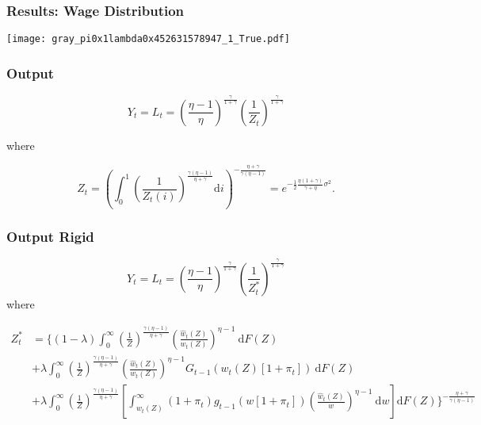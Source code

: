 \documentclass{beamer}
\begin{document}
\begin{frame}[t]\frametitle{Results: Wage Distribution}

    \begin{center}
      \texttt{[image: gray\_pi0x1lambda0x452631578947\_1\_True.pdf]}
      \label{fig:dist_1_periods}
    \end{center}


\end{frame}


\begin{frame}[t]\frametitle{Output}

    \begin{equation*}
        \label{eq:output_flexible}
        Y_t = L_t = \left( \frac{\eta - 1}{\eta} \right)^{\frac{\gamma}{1 + \gamma}} \left( \frac{1}{Z_t} \right)^{\frac{\gamma}{1 + \gamma}}
    \end{equation*}

    where

    \begin{equation*}
        Z_t = \left( \int_{0}^{1}\! \left( \frac{1}{Z_t(i)} \right)^{\frac{\gamma(\eta - 1)}{\eta + \gamma}} \mathrm{d}i \right)^{-\frac{\eta + \gamma}{\gamma(\eta - 1)}} \!\!\! = e^{-\frac{1}{2} \frac{\eta(1 + \gamma)}{\gamma + \eta}\sigma^2 }.
    \end{equation*}


\end{frame}

\begin{frame}[t]\frametitle{Output Rigid}

    \begin{equation*}
        \label{eq:output_rigid}
        Y_t = L_t = \left(\frac{\eta - 1}{\eta} \right)^{\frac{\gamma}{1 + \gamma}}\left( \frac{1}{Z_t^*} \right)^{\frac{\gamma}{1 + \gamma}}
    \end{equation*}
    where

    \begin{equation*}
        \label{eq:z_star}
        \begin{split}
        Z_t^* &= \Big\{(1 - \lambda) \int_{0}^{\infty} \! \left( \frac{1}{Z} \right)^{\frac{\gamma(\eta - 1)}{\eta + \gamma}} \left( \frac{\hat{w}_t(Z)}{w_t(Z)} \right)^{\eta - 1}\ \mathrm{d}F(Z) \\
              &+            \lambda  \int_{0}^{\infty} \! \left( \frac{1}{Z} \right)^{\frac{\gamma(\eta - 1)}{\eta + \gamma}} \left( \frac{\hat{w}_t(Z)}{w_t(Z)} \right)^{\eta - 1} G_{t-1}\left( w_t(Z)[1 + \pi_t] \right)                                                     \ \mathrm{d}F(Z)\\
              &+            \lambda  \int_{0}^{\infty} \! \left( \frac{1}{Z} \right)^{\frac{\gamma(\eta - 1)}{\eta + \gamma}} \left[ \int_{w_t(Z)}^{\infty} (1 + \pi_t)g_{t-1}\left( w[1 + \pi_t] \right) \left( \frac{\hat{w}_t(Z)}{w} \right)^{\eta - 1}\ \mathrm{d}w \right] \mathrm{d}F(Z)
                \Big\}^{-\frac{\eta + \gamma}{\gamma(\eta - 1)}}
        \end{split}
    \end{equation*}

\end{frame}
\end{document}
